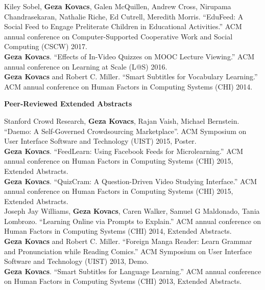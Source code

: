 \documentclass[10pt,A4]{article}
\newcommand{\cvsection}[1]
{
	\begin{center}
		\large\textcolor{sectcol}{\textbf{#1}}
	\end{center}
}
\begin{document}
Kiley Sobel, \textbf{Geza Kovacs}, Galen McQuillen, Andrew Cross, Nirupama Chandrasekaran, Nathalie Riche, Ed Cutrell, Meredith Morris. ``EduFeed: A Social Feed to Engage Preliterate Children in Educational Activities.'' ACM annual conference on Computer-Supported Cooperative Work and Social Computing (CSCW) 2017.\\ %

\textbf{Geza Kovacs}. ``Effects of In-Video Quizzes on MOOC Lecture Viewing.'' ACM annual conference on Learning at Scale (L@S) 2016.\\ %

\textbf{Geza Kovacs} and Robert C. Miller. ``Smart Subtitles for Vocabulary Learning.'' ACM annual conference on Human Factors in Computing Systems (CHI) 2014.\\ %

\cvsection{Peer-Reviewed Extended Abstracts}

Stanford Crowd Research, \textbf{Geza Kovacs}, Rajan Vaish, Michael Bernstein. ``Daemo: A Self-Governed Crowdsourcing Marketplace''. ACM Symposium on User Interface Software and Technology (UIST) 2015, Poster.\\

\textbf{Geza Kovacs}. ``FeedLearn: Using Facebook Feeds for Microlearning.'' ACM annual conference on Human Factors in Computing Systems (CHI) 2015, Extended Abstracts.\\ %

\textbf{Geza Kovacs}. ``QuizCram: A Question-Driven Video Studying Interface.'' ACM annual conference on Human Factors in Computing Systems (CHI) 2015, Extended Abstracts.\\

Joseph Jay Williams, \textbf{Geza Kovacs}, Caren Walker, Samuel G Maldonado, Tania Lombrozo. ``Learning Online via Prompts to Explain.'' ACM annual conference on Human Factors in Computing Systems (CHI) 2014, Extended Abstracts.\\

\textbf{Geza Kovacs} and Robert C. Miller. ``Foreign Manga Reader: Learn Grammar and Pronunciation while Reading Comics.'' ACM Symposium on User Interface Software and Technology (UIST) 2013, Demo.\\

\textbf{Geza Kovacs}. ``Smart Subtitles for Language Learning.'' ACM annual conference on Human Factors in Computing Systems (CHI) 2013, Extended Abstracts.\\ %
\end{document}
